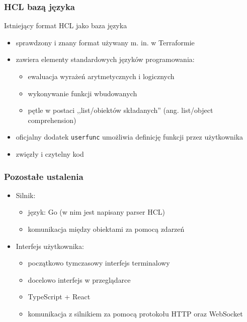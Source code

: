 \documentclass{beamer}
\begin{document}
\begin{frame}
	\frametitle{HCL bazą języka}
	Istniejący format HCL jako baza języka
	\begin{itemize}
		\item sprawdzony i znany format używany m. in. w Terraformie\footnotemark
		\item zawiera elementy standardowych języków programowania:
		      \begin{itemize}
			      \item ewaluacja wyrażeń arytmetycznych i logicznych
			      \item wykonywanie funkcji wbudowanych
			      \item pętle w postaci ,,list/obiektów składanych'' (ang. list/object comprehension)
		      \end{itemize}
		\item oficjalny dodatek {\tt userfunc} umożliwia definicję funkcji przez użytkownika
		\item zwięzły i czytelny kod
	\end{itemize}
\end{frame}

\begin{frame}%
	\frametitle{Pozostałe ustalenia}
	\begin{itemize}
		\item Silnik:
		      \begin{itemize}
			      \item język: Go (w nim jest napisany parser HCL)
			      \item komunikacja między obiektami za pomocą zdarzeń %
		      \end{itemize}
		\item Interfejs użytkownika:
		      \begin{itemize}
			      \item początkowo tymczasowy interfejs terminalowy
			      \item docelowo interfejs w przeglądarce
			      \item TypeScript + React
			      \item komunikacja z silnikiem za pomocą protokołu HTTP oraz WebSocket
		      \end{itemize}
	\end{itemize}
\end{frame}
\end{document}
